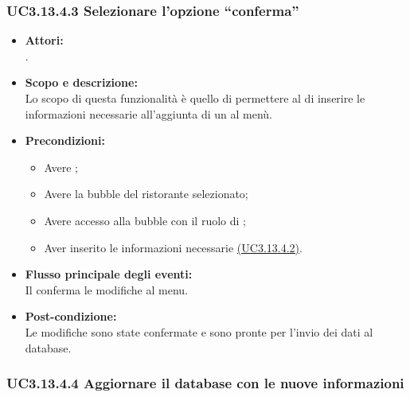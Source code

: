 \subsubsection{UC3.13.4.3 Selezionare l’opzione “conferma”} \label{UC3.13.4.3}

\begin{itemize}
	\item \textbf{Attori:}
	\\.
	\item \textbf{Scopo e descrizione:} 
	\\Lo scopo di questa funzionalità è quello di permettere al  di inserire le informazioni necessarie all’aggiunta di un  al menù.
	\item \textbf{Precondizioni:}
	\begin{itemize}
		\item Avere ;
		\item Avere la bubble del ristorante selezionato;
		\item Avere accesso alla bubble con il ruolo di ;
		\item Aver inserito le informazioni necessarie \hyperref[UC3.13.4.2]{(UC3.13.4.2)}.
	\end{itemize}
	\item \textbf{Flusso principale degli eventi:}
	\\Il {} conferma le modifiche al menu.
	\item \textbf{Post-condizione:}
	\\Le modifiche sono state confermate e sono pronte per l'invio dei dati al database.
\end{itemize}

\subsubsection{UC3.13.4.4 Aggiornare il database con le nuove informazioni} \label{UC3.13.4.4}

